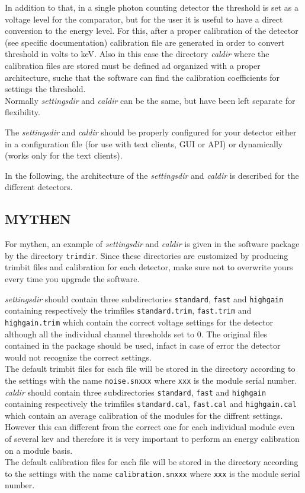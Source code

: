 In addition to that, in a single photon counting detector the threshold is set as a voltage level for the comparator, but for the user it is useful to have a direct conversion to the energy level. For this, after a proper calibration of the detector (see specific documentation) calibration file are generated in order to convert threshold in volts to keV. Also in this case the directory \textit{caldir} where the calibration files are stored must be defined ad organized with a proper architecture, suche that the software can find the calibration coefficients for settings the threshold.\\
Normally \textit{settingsdir} and \textit{caldir} can be the same, but have been left separate for flexibility.

The \textit{settingsdir} and \textit{caldir} should be properly configured for your detector either in a configuration file (for use with text clients, GUI or API) or dynamically (works only for the text clients).

In the following, the architecture of the \textit{settingsdir} and \textit{caldir} is described for the different detectors.

\subsection{MYTHEN}
For mythen, an example of \textit{settingsdir} and \textit{caldir} is  given in the software package by the directory \verb=trimdir=. 
Since these directories are customized by producing trimbit files and calibration for each detector, make sure not to overwrite yours every time you upgrade the software.

\textit{settingsdir} should contain three subdirectories \verb=standard=,  \verb=fast= and  \verb=highgain= containing respectively the trimfiles \verb=standard.trim=,  \verb=fast.trim= and  \verb=highgain.trim= which contain the correct voltage settings for the detector although all the individual channel thresholds set to 0. The original files contained in the package should be used, infact in case of error the detector would not recognize the correct settings.\\
The default trimbit files for each file will be stored in the directory according to the settings with the name \verb=noise.snxxx= where \verb=xxx= is the module serial number.\\

\textit{caldir} should contain three subdirectories \verb=standard=,  \verb=fast= and  \verb=highgain= containing respectively the trimfiles \verb=standard.cal=,  \verb=fast.cal= and  \verb=highgain.cal= which contain an average calibration of the modules for the diffrent settings. However this can different from the correct one for each individual module even of several kev and therefore it is very important to perform an energy calibration on a module basis.\\
The default calibration files for each file will be stored in the directory according to the settings with the name \verb=calibration.snxxx= where \verb=xxx= is the module serial number.


